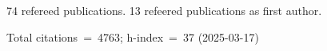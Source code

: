 74 refereed publications. 13 refeered publications as first author.

Total citations~=~4763; h-index~=~37 (2025-03-17)